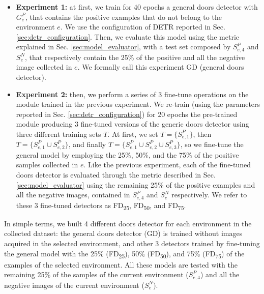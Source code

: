 \begin{itemize}
	\item \textbf{Experiment 1:} at first, we train for 40 epochs a general doors detector with $G^{P}_e$, that contains the positive examples that do not belong to the environment $e$. We use the configuration of DETR reported in Sec. \ref{sec:detr_configuration}. Then, we evaluate this model using the metric explained in Sec. \ref{sec:model_evaluator}, with a test set composed by $S^{P}_{e, 4}$ and $S^{N}_e$, that respectively contain the 25\% of the positive and all the negative image collected in $e$. We formally call this experiment \textsf{GD} (general doors detector). 
	
	\item \textbf{Experiment 2:} then, we perform a series of 3 fine-tune operations on the module trained in the previous experiment. We re-train (using the parameters reported in Sec. \ref{sec:detr_configuration}) for 20 epochs  the pre-trained module producing 3 fine-tuned versions of the generic doors detector using three different training sets $T$. At first, we set $ T= \big\{S^{P}_{e, 1}\big\}$, then $T=\big\{S^{P}_{e, 1} \cup S^{P}_{e, 2}\big\}$, and finally $T=\big\{S^{P}_{e, 1} \cup S^{P}_{e, 2} \cup S^{P}_{e, 3}\big\}$, so we fine-tune the general model by employing the  25\%, 50\%, and the 75\% of the positive samples collected in $e$. Like the previous experiment, each of the fine-tuned doors detector is evaluated through the metric described in Sec. \ref{sec:model_evaluator} using the remaining 25\% of the positive examples and all the negative images, contained in $S^{P}_{e, 4}$ and $S^{N}_e$ respectively. We refer to these 3 fine-tuned detectors as \textsf{FD\textsubscript{25}}, \textsf{FD\textsubscript{50}}, and \textsf{FD\textsubscript{75}}. 

\end{itemize}

In simple terms, we built 4 different doors detector for each environment in the collected dataset: the general doors detector (\textsf{GD}) is trained without images acquired in the selected environment, and other 3 detectors trained by fine-tuning the general model with the 25\% (\textsf{FD\textsubscript{25}}), 50\% (\textsf{FD\textsubscript{50}}), and 75\% (\textsf{FD\textsubscript{75}}) of the examples of the selected environment. All these models are tested with the remaining 25\% of the samples of the current environment ($S^{P}_{e,4}$) and all the negative images of the current environment ($S^{N}_{e}$).

